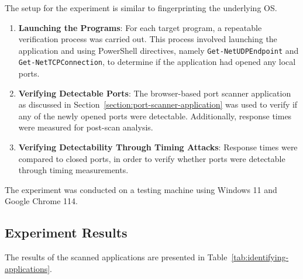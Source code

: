 The setup for the experiment is similar to fingerprinting the underlying OS.

\begin{enumerate}
    \item \textbf{Launching the Programs}: For each target program, a repeatable verification process was carried out. This process involved launching the application and using PowerShell directives, namely \texttt{Get-NetUDPEndpoint} and \texttt{Get-NetTCPConnection}, to determine if the application had opened any local ports.
    
    \item \textbf{Verifying Detectable Ports}: The browser-based port scanner application as discussed in Section~\ref{section:port-scanner-application} was used to verify if any of the newly opened ports were detectable. Additionally, response times were measured for post-scan analysis.   

    \item \textbf{Verifying Detectability Through Timing Attacks}: Response times were compared to closed ports, in order to verify whether ports were detectable through timing measurements.
\end{enumerate}

The experiment was conducted on a testing machine using Windows 11 and Google Chrome 114. 

\subsection{Experiment Results}

The results of the scanned applications are presented in Table~\ref{tab:identifying-applications}.

